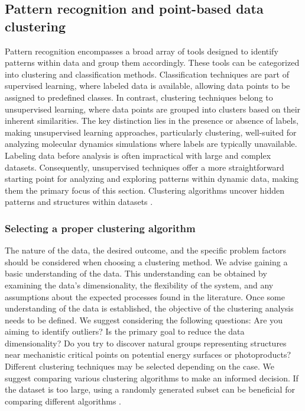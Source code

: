\documentclass[9pt,bestpractices]{livecoms}
\begin{document}
\subsection{Pattern recognition and point-based data clustering}
\label{sec:clustering}

Pattern recognition encompasses a broad array of tools designed to identify patterns within data and group them accordingly. These tools can be categorized into clustering and classification methods. Classification techniques are part of supervised learning, where labeled data is available, allowing data points to be assigned to predefined classes. In contrast, clustering techniques belong to unsupervised learning, where data points are grouped into clusters based on their inherent similarities. The key distinction lies in the presence or absence of labels, making unsupervised learning approaches, particularly clustering, well-suited for analyzing molecular dynamics simulations where labels are typically unavailable. Labeling data before analysis is often impractical with large and complex datasets. Consequently, unsupervised techniques offer a more straightforward starting point for analyzing and exploring patterns within dynamic data, making them the primary focus of this section. Clustering algorithms uncover hidden patterns and structures within datasets \cite{RN20}. 

\subsubsection{Selecting a proper clustering algorithm}

The nature of the data, the desired outcome, and the specific problem factors should be considered when choosing a clustering method. We advise gaining a basic understanding of the data. This understanding can be obtained by examining the data's dimensionality, the flexibility of the system, and any assumptions about the expected processes found in the literature. Once some understanding of the data is established, the objective of the clustering analysis needs to be defined. We suggest considering the following questions: Are you aiming to identify outliers? Is the primary goal to reduce the data dimensionality? Do you try to discover natural groups representing structures near mechanistic critical points on potential energy surfaces or photoproducts? 
Different clustering techniques may be selected depending on the case. We suggest comparing various clustering algorithms to make an informed decision. If the dataset is too large, using a randomly generated subset can be beneficial for comparing different algorithms \cite{RN97, RN135, RN130}.
\end{document}
